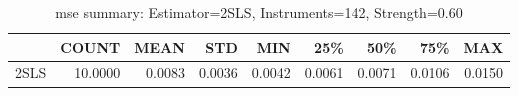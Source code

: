 \begin{table}[ht]
\centering
\caption{mse summary: Estimator=2SLS, Instruments=142, Strength=0.60}
\begin{tabular}{lrrrrrrrr}
\toprule
 & COUNT & MEAN & STD & MIN & 25\% & 50\% & 75\% & MAX \\
\midrule
2SLS & 10.0000 & 0.0083 & 0.0036 & 0.0042 & 0.0061 & 0.0071 & 0.0106 & 0.0150 \\
\bottomrule
\end{tabular}
\end{table}
